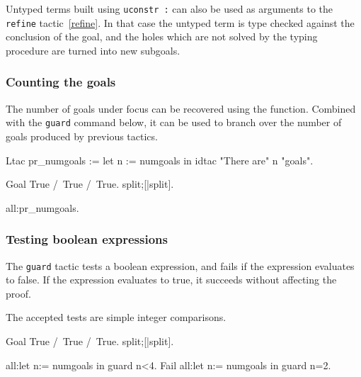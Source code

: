\begin{quote}
{}
\end{quote}

Untyped terms built using {\tt uconstr :} can also be used as
arguments to the {\tt refine} tactic~\ref{refine}. In that case the
untyped term is type checked against the conclusion of the goal, and
the holes which are not solved by the typing procedure are turned into
new subgoals.

\subsubsection[Counting the goals]{Counting the goals}

The number of goals under focus can be recovered using the {}
function. Combined with the {\tt guard} command below, it can be used to branch
over the number of goals produced by previous tactics.

\begin{coq_example*}
Ltac pr_numgoals := let n := numgoals in idtac "There are" n "goals".

Goal True /\ True /\ True.
split;[|split].
\end{coq_example*}
\begin{coq_example}
all:pr_numgoals.
\end{coq_example}

\subsubsection[Testing boolean expressions]{Testing boolean expressions}

The {\tt guard} tactic tests a boolean expression, and fails if the expression evaluates to false. If the expression evaluates to true, it succeeds without affecting the proof.

\begin{quote}
{}
\end{quote}

The accepted tests are simple integer comparisons.

\begin{coq_example*}
Goal True /\ True /\ True.
split;[|split].
\end{coq_example*}
\begin{coq_example}
all:let n:= numgoals in guard n<4.
Fail all:let n:= numgoals in guard n=2.
\end{coq_example}
\begin{ErrMsgs}

\item {}

\end{ErrMsgs}


